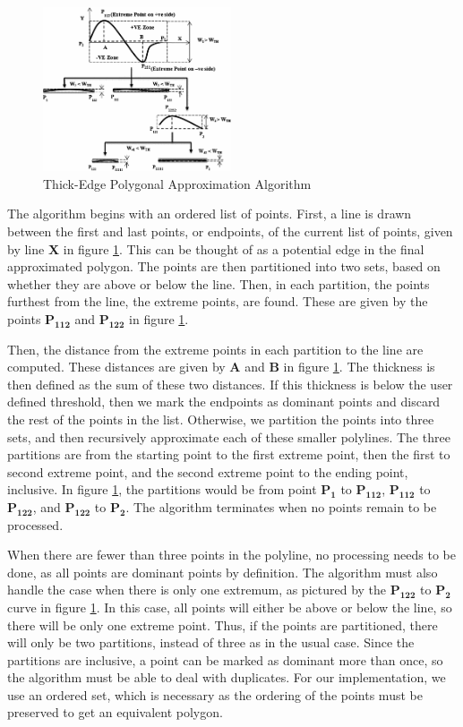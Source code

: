 \documentclass[10pt,twocolumn,letterpaper]{article}
\begin{document}
\begin{figure}
	\centering
    \includegraphics[width=0.495\textwidth]{images/thickedge_algorithm}
    \caption{Thick-Edge Polygonal Approximation Algorithm}
    \label{fig:thickedge_algorithm}
\end{figure}

The algorithm begins with an ordered list of points. First, a line is drawn between the first and last points, or
endpoints, of the current list of points, given by line \textbf{X} in figure \ref{fig:thickedge_algorithm}.  This can be
thought of as a potential edge in the final approximated polygon. The points are then partitioned into two sets, based
on whether they are above or below the line. Then, in each partition, the points furthest from the line, the extreme
points, are found. These are given by the points $\mathbf{P_{112}}$ and $\mathbf{P_{122}}$ in figure
\ref{fig:thickedge_algorithm}.

Then, the distance from the extreme points in each partition to the line are computed. These distances are given by
$\mathbf{A}$ and $\mathbf{B}$ in figure \ref{fig:thickedge_algorithm}. The thickness is then defined as the sum of these
two distances. If this thickness is below the user defined threshold, then we mark the endpoints as dominant points and
discard the rest of the points in the list. Otherwise, we partition the points into three sets, and then recursively
approximate each of these smaller polylines. The three partitions are from the starting point to the first extreme
point, then the first to second extreme point, and the second extreme point to the ending point, inclusive. In figure
\ref{fig:thickedge_algorithm}, the partitions would be from point $\mathbf{P_1}$ to $\mathbf{P_{112}}$,
$\mathbf{P_{112}}$ to $\mathbf{P_{122}}$, and $\mathbf{P_{122}}$ to $\mathbf{P_2}$. The algorithm terminates when no
points remain to be processed.

When there are fewer than three points in the polyline, no processing needs to be done, as all points are dominant
points by definition. The algorithm must also handle the case when there is only one extremum, as pictured by the
$\mathbf{P_{122}}$ to $\mathbf{P_2}$ curve in figure \ref{fig:thickedge_algorithm}. In this case, all points will either
be above or below the line, so there will be only one extreme point. Thus, if the points are partitioned, there will
only be two partitions, instead of three as in the usual case. Since the partitions are inclusive, a point can be marked
as dominant more than once, so the algorithm must be able to deal with duplicates. For our implementation, we use an
ordered set, which is necessary as the ordering of the points must be preserved to get an equivalent polygon.
\end{document}
